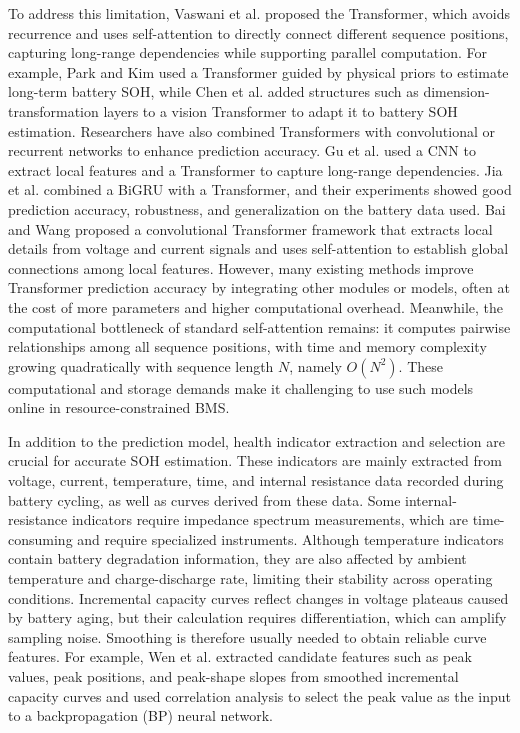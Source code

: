 To address this limitation, Vaswani et al.\cite{ref34} proposed the Transformer, which avoids recurrence and uses self-attention to directly connect different sequence positions, capturing long-range dependencies while supporting parallel computation. For example, Park and Kim\cite{ref38} used a Transformer guided by physical priors to estimate long-term battery SOH, while Chen et al.\cite{ref37} added structures such as dimension-transformation layers to a vision Transformer to adapt it to battery SOH estimation. Researchers have also combined Transformers with convolutional or recurrent networks to enhance prediction accuracy. Gu et al.\cite{ref35} used a CNN to extract local features and a Transformer to capture long-range dependencies. Jia et al.\cite{ref32} combined a BiGRU with a Transformer, and their experiments showed good prediction accuracy, robustness, and generalization on the battery data used. Bai and Wang\cite{ref36} proposed a convolutional Transformer framework that extracts local details from voltage and current signals and uses self-attention to establish global connections among local features. However, many existing methods improve Transformer prediction accuracy by integrating other modules or models, often at the cost of more parameters and higher computational overhead. Meanwhile, the computational bottleneck of standard self-attention remains: it computes pairwise relationships among all sequence positions, with time and memory complexity growing quadratically with sequence length $N$, namely $O(N^2)$\cite{ref39,ref40}. These computational and storage demands make it challenging to use such models online in resource-constrained BMS\cite{ref31}.

In addition to the prediction model, health indicator extraction and selection are crucial for accurate SOH estimation. These indicators are mainly extracted from voltage, current, temperature, time, and internal resistance data recorded during battery cycling, as well as curves derived from these data\cite{ref47,ref49}. Some internal-resistance indicators require impedance spectrum measurements, which are time-consuming and require specialized instruments. Although temperature indicators contain battery degradation information, they are also affected by ambient temperature and charge-discharge rate, limiting their stability across operating conditions\cite{ref64}. Incremental capacity curves reflect changes in voltage plateaus caused by battery aging, but their calculation requires differentiation, which can amplify sampling noise. Smoothing is therefore usually needed to obtain reliable curve features. For example, Wen et al.\cite{ref50} extracted candidate features such as peak values, peak positions, and peak-shape slopes from smoothed incremental capacity curves and used correlation analysis to select the peak value as the input to a backpropagation (BP) neural network.

